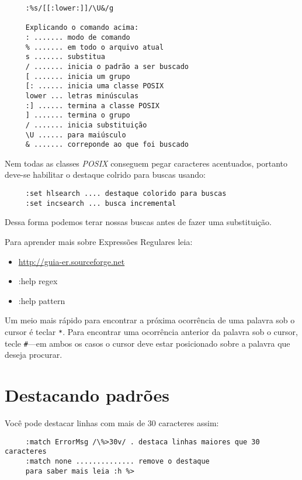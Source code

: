 \begin{verbatim}
     :%s/[[:lower:]]/\U&/g

     Explicando o comando acima:
     : ....... modo de comando
     % ....... em todo o arquivo atual
     s ....... substitua
     / ....... inicia o padrão a ser buscado
     [ ....... inicia um grupo
     [: ...... inicia uma classe POSIX
     lower ... letras minúsculas
     :] ...... termina a classe POSIX
     ] ....... termina o grupo
     / ....... inicia substituição
     \U ...... para maiúsculo
     & ....... correponde ao que foi buscado
\end{verbatim}

Nem todas as classes {\em POSIX} conseguem pegar caracteres 
acentuados, portanto deve-se habilitar o destaque colrido para
buscas usando:
    
\begin{verbatim}
     :set hlsearch .... destaque colorido para buscas
     :set incsearch ... busca incremental
\end{verbatim}

Dessa forma podemos terar nossas buscas antes de fazer 
uma substituição.


Para aprender mais sobre Expressões Regulares leia:

\begin{itemize}
  \item \url{http://guia-er.sourceforge.net}
  \item :help regex
  \item :help pattern
\end{itemize}

    Um meio mais rápido para encontrar a próxima ocorrência de uma palavra sob o
cursor é teclar \verb|*|. Para encontrar uma ocorrência anterior da palavra
sob o cursor, tecle \verb|#|---em ambos os casos o cursor deve estar
posicionado sobre a palavra que deseja procurar.

\section{Destacando padrões}\label{sec:Destacando padrões}

Você pode destacar linhas com mais de 30 caracteres assim:

\begin{verbatim}
     :match ErrorMsg /\%>30v/ . destaca linhas maiores que 30 caracteres
     :match none .............. remove o destaque
     para saber mais leia :h %>
\end{verbatim}


